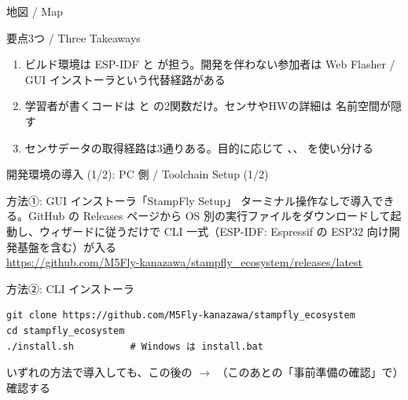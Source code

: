 
\begin{frame}{地図 / Map}
  \centering
  \vspace{-1mm}
\end{frame}

\begin{frame}{要点3つ / Three Takeaways}
  \begin{enumerate}
    \item ビルド環境は ESP-IDF と  が担う。開発を伴わない参加者は Web Flasher / GUI インストーラという代替経路がある
    \item 学習者が書くコードは  と  の2関数だけ。センサやHWの詳細は  名前空間が隠す
    \item センサデータの取得経路は3通りある。目的に応じて 、、 を使い分ける
  \end{enumerate}
\end{frame}

\begin{frame}[fragile]{開発環境の導入 (1/2): PC 側 / Toolchain Setup (1/2)}
  \begin{block}{方法①: GUI インストーラ「StampFly Setup」}
    \footnotesize ターミナル操作なしで導入できる。GitHub の Releases ページから OS 別の実行ファイルをダウンロードして起動し、ウィザードに従うだけで  CLI 一式（ESP-IDF: Espressif の ESP32 向け開発基盤を含む）が入る\\
    \url{https://github.com/M5Fly-kanazawa/stampfly_ecosystem/releases/latest}
  \end{block}

  \vspace{0.15em}

  \begin{exampleblock}{方法②: CLI インストーラ}
    \begin{lstlisting}[style=sfbash, numbers=none]
git clone https://github.com/M5Fly-kanazawa/stampfly_ecosystem
cd stampfly_ecosystem
./install.sh          # Windows は install.bat
    \end{lstlisting}
  \end{exampleblock}

  \vspace{0.15em}

  {\scriptsize いずれの方法で導入しても、この後の  $\to$ （このあとの「事前準備の確認」で）確認する}
\end{frame}

